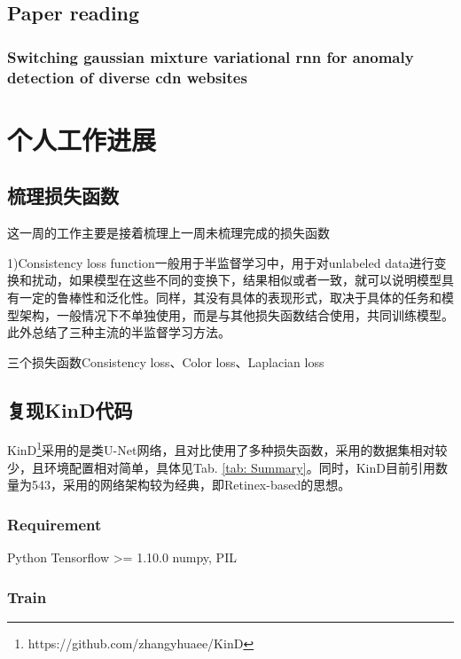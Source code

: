 \documentclass[letterpaper,12pt]{article}
\begin{document}
	\subsection{Paper reading}
	
	\subsubsection{Switching gaussian mixture variational rnn for anomaly detection of diverse cdn websites}
	
	
	
	\section{个人工作进展}
	
	\subsection{梳理损失函数}
	
	这一周的工作主要是接着梳理上一周未梳理完成的损失函数
	
	1)Consistency loss function一般用于半监督学习中，用于对unlabeled data进行变换和扰动，如果模型在这些不同的变换下，结果相似或者一致，就可以说明模型具有一定的鲁棒性和泛化性。同样，其没有具体的表现形式，取决于具体的任务和模型架构，一般情况下不单独使用，而是与其他损失函数结合使用，共同训练模型。此外总结了三种主流的半监督学习方法。
	
	三个损失函数Consistency loss、Color loss、Laplacian loss
	
	
	\subsection{复现KinD代码}
	
	KinD\footnote{https://github.com/zhangyhuaee/KinD}采用的是类U-Net网络，且对比使用了多种损失函数，采用的数据集相对较少，且环境配置相对简单，具体见Tab. \ref{tab: Summary}。同时，KinD\cite{10.1145/3343031.3350926}目前引用数量为543，采用的网络架构较为经典，即Retinex-based的思想。
	
		\subsubsection{Requirement}
	
		\begin{python}
		Python
		Tensorflow >= 1.10.0
		numpy, PIL
		\end{python}
	
		\subsubsection{Train}
	
\end{document}
